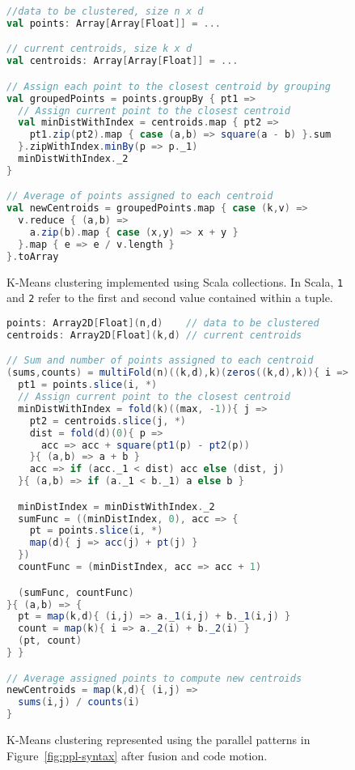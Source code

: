 \begin{figure}
\centering
\begin{lstlisting}[language=Scala]
//data to be clustered, size n x d
val points: Array[Array[Float]] = ...

// current centroids, size k x d
val centroids: Array[Array[Float]] = ...

// Assign each point to the closest centroid by grouping
val groupedPoints = points.groupBy { pt1 =>
  // Assign current point to the closest centroid
  val minDistWithIndex = centroids.map { pt2 =>
    pt1.zip(pt2).map { case (a,b) => square(a - b) }.sum
  }.zipWithIndex.minBy(p => p._1)
  minDistWithIndex._2
}

// Average of points assigned to each centroid
val newCentroids = groupedPoints.map { case (k,v) =>
  v.reduce { (a,b) =>
    a.zip(b).map { case (x,y) => x + y }
  }.map { e => e / v.length }
}.toArray
\end{lstlisting}
\caption{K-Means clustering implemented using Scala collections. In Scala, \textunderscore\texttt{1} and \textunderscore\texttt{2} refer to the first and second value contained within a tuple.}
\label{fig:kmeans}
\end{figure}

\begin{figure}\centering
\begin{lstlisting}[language=Scala]
points: Array2D[Float](n,d)    // data to be clustered
centroids: Array2D[Float](k,d) // current centroids

// Sum and number of points assigned to each centroid
(sums,counts) = multiFold(n)((k,d),k)(zeros((k,d),k)){ i =>
  pt1 = points.slice(i, *)
  // Assign current point to the closest centroid
  minDistWithIndex = fold(k)((max, -1)){ j =>
    pt2 = centroids.slice(j, *)
    dist = fold(d)(0){ p =>
      acc => acc + square(pt1(p) - pt2(p))
    }{ (a,b) => a + b }
    acc => if (acc._1 < dist) acc else (dist, j)
  }{ (a,b) => if (a._1 < b._1) a else b }

  minDistIndex = minDistWithIndex._2
  sumFunc = ((minDistIndex, 0), acc => {
    pt = points.slice(i, *)
    map(d){ j => acc(j) + pt(j) }
  })
  countFunc = (minDistIndex, acc => acc + 1)

  (sumFunc, countFunc)
}{ (a,b) => {
  pt = map(k,d){ (i,j) => a._1(i,j) + b._1(i,j) }
  count = map(k){ i => a._2(i) + b._2(i) }
  (pt, count)
} }

// Average assigned points to compute new centroids
newCentroids = map(k,d){ (i,j) =>
  sums(i,j) / counts(i)
}
\end{lstlisting}
\caption{K-Means clustering represented using the parallel patterns in Figure~\ref{fig:ppl-syntax} after fusion and code motion.}
\label{fig:kmeans-fused}
\end{figure}

